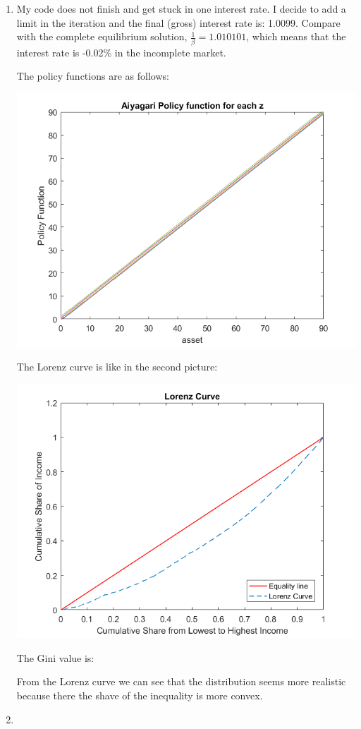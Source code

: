 \documentclass[12pt]{article}%
\begin{document}
\begin{enumerate}
	\item My code does not finish and get stuck in one interest rate. I decide to add a limit in the iteration and the final (gross) interest rate is: 1.0099. Compare with the complete equilibrium solution, $\frac{1}{\beta}=1.010101$, which means that the interest rate is -0.02\% in the incomplete market.
	
	The policy functions are as follows:
	
	\begin{center}
		\includegraphics[width=0.7\linewidth]{policy}
	\end{center}
	
	
	The Lorenz curve is like in the second picture:
	
	\begin{center}
		\includegraphics[width=0.7\linewidth]{Lorenz}
	\end{center}
	
	
	The Gini value is:
	
	
	From the Lorenz curve we can see that the distribution seems more realistic because there the shave of the inequality is more convex.
	
	\item 
	
	
\end{enumerate}

\strut

\onehalfspacing
\end{document}
